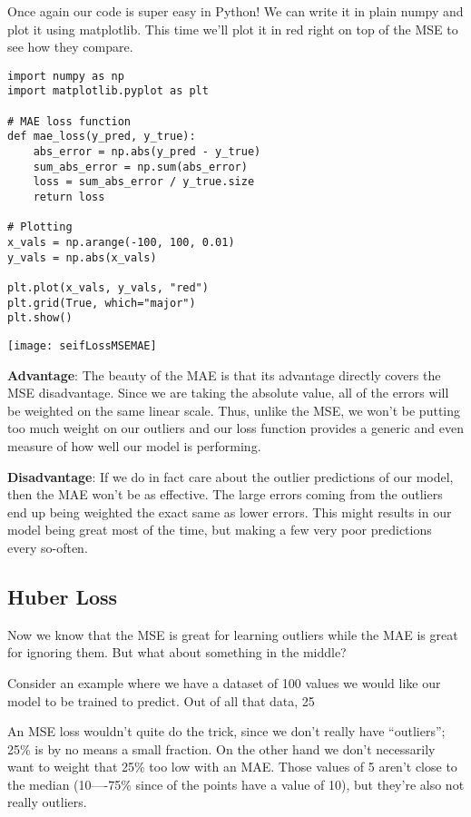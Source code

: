 Once again our code is super easy in Python! We can write it in plain numpy and plot it using matplotlib. This time we'll plot it in red right on top of the MSE to see how they compare.

\begin{lstlisting}
import numpy as np
import matplotlib.pyplot as plt

# MAE loss function
def mae_loss(y_pred, y_true):
    abs_error = np.abs(y_pred - y_true)
    sum_abs_error = np.sum(abs_error)
    loss = sum_abs_error / y_true.size
    return loss
    
# Plotting
x_vals = np.arange(-100, 100, 0.01)
y_vals = np.abs(x_vals)

plt.plot(x_vals, y_vals, "red")
plt.grid(True, which="major")
plt.show()
\end{lstlisting}

\begin{marginfigure}
\texttt{[image: seifLossMSEMAE]}
\end{marginfigure}

\textbf{Advantage}: The beauty of the MAE is that its advantage directly covers the MSE disadvantage. Since we are taking the absolute value, all of the errors will be weighted on the same linear scale. Thus, unlike the MSE, we won't be putting too much weight on our outliers and our loss function provides a generic and even measure of how well our model is performing.

\textbf{Disadvantage}: If we do in fact care about the outlier predictions of our model, then the MAE won't be as effective. The large errors coming from the outliers end up being weighted the exact same as lower errors. This might results in our model being great most of the time, but making a few very poor predictions every so-often. 


\subsection{Huber Loss}

Now we know that the MSE is great for learning outliers while the MAE is great for ignoring them. But what about something in the middle?

Consider an example where we have a dataset of 100 values we would like our model to be trained to predict. Out of all that data, 25%

An MSE loss wouldn't quite do the trick, since we don't really have ``outliers''; 25\% is by no means a small fraction. On the other hand we don't necessarily want to weight that 25\% too low with an MAE. Those values of 5 aren't close to the median (10----75\% since of the points have a value of 10), but they're also not really outliers.

